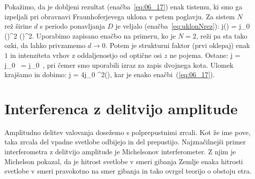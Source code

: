 Pokažimo, da je dobljeni rezultat (enačba~\ref{eq:06_17}) enak tistemu, 
ki smo ga izpeljali pri obravnavi Fraunhoferjevega uklona v petem poglavju. 
Za sistem $N$ rež širine $d$ s periodo ponavljanja $D$ je veljalo 
(enačba~\ref{eq:uklonNrez}):
\beq
j(\vartheta) = j_0 \left(\right)^2
\left(\right)^2\!\!.
\label{eq:06_22}
\eeq
Uporabimo zapisano enačbo na primeru, ko je $N=2$, reži pa sta tako ozki, da lahko 
privzamemo $d\to 0$. Potem je strukturni faktor (prvi oklepaj) enak $1$ in 
intenziteta vrhov z oddaljenostjo od optične osi $z$ ne pojema. Ostane:
\beq
j = j_0~ = 
j_0~,
\eeq
pri čemer smo uporabili izraz za zapis dvojnega kota. Ulomek krajšamo in dobimo:
\beq
j = 4j_0 \cos^2\left(\right)\!\!,
\label{eq:06_23}
\eeq
kar je enako enačbi~(\ref{eq:06_17}).


\section{Interferenca z delitvijo amplitude}
Amplitudno delitev valovanja dosežemo s polprepustnimi zrcali. Kot že ime pove, taka
zrcala del vpadne svetlobe odbijejo in del prepustijo. 
Najznačilnejši primer interferometra z delitvijo amplitude je Michelsonov interferometer.
Z njim je Michelson pokazal, da je hitrost svetlobe v smeri gibanja Zemlje enaka hitrosti
svetlobe v smeri pravokotno na smer gibanja in tako ovrgel teorijo o obstoju etra. 

